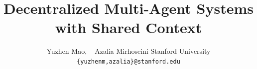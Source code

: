 \documentclass{article}
\theoremstyle{plain}
\theoremstyle{remark}
\begin{document}
\title{Decentralized Multi-Agent Systems with Shared Context}
\author{
    \large{Yuzhen Mao, ~
Azalia Mirhoseini}\linebreak
    \large{Stanford University}\linebreak
        {\texttt{\{yuzhenm,azalia\}@stanford.edu}}
}

\date{}

\maketitle







\newpage







\newpage
\appendix
\onecolumn


\end{document}
